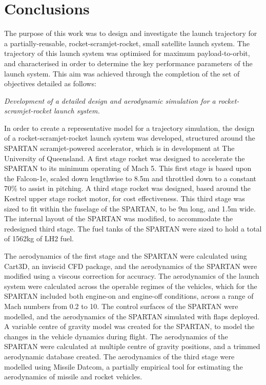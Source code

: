 
\cleardoublepage
\chapter{Conclusions}


The purpose of this work was to design and investigate the launch trajectory for a partially-reusable, rocket-scramjet-rocket, small satellite launch system. 
The trajectory of this launch system was optimised for maximum payload-to-orbit, and characterised in order to determine the key performance parameters of the launch system. 
This aim was achieved through the completion of the set of objectives detailed as follows:

	\emph{Development of a detailed design and aerodynamic simulation for a rocket-scramjet-rocket launch system.}
	
	In order to create a representative model for a trajectory simulation, the design of a rocket-scramjet-rocket launch system was developed, structured around the SPARTAN scramjet-powered accelerator, which is in development at The University of Queensland. A first stage rocket was designed to accelerate the SPARTAN to its minimum operating of Mach 5. This first stage is based upon the Falcon-1e, scaled down lengthwise to 8.5m and throttled down to a constant 70\% to assist in pitching.
	A third stage rocket was designed, based around the Kestrel upper stage rocket motor, for cost effectiveness. This third stage was sized to fit within the fuselage of the SPARTAN, to be 9m long, and 1.5m wide.   
The internal layout of the SPARTAN was modified, to accommodate the redesigned third stage. The fuel tanks of the SPARTAN were sized to hold a total of 1562kg of LH2 fuel. 

The aerodynamics of the first stage and the SPARTAN were calculated using Cart3D, an inviscid CFD package, and the aerodynamics of the SPARTAN were modified using a viscous correction for accuracy. The aerodynamics of the launch system were calculated across the operable regimes of the vehicles, which for the SPARTAN included both engine-on and engine-off conditions, across a range of Mach numbers from 0.2 to 10. The control surfaces of the SPARTAN were modelled, and the aerodynamics of the SPARTAN simulated with flaps deployed. A variable centre of gravity model was created for the SPARTAN, to model the changes in the vehicle dynamics during flight. The aerodynamics of the SPARTAN were calculated at multiple centre of gravity positions, and a trimmed aerodynamic database created. 
The aerodynamics of the third stage were modelled using Missile Datcom, a partially empirical tool for estimating the aerodynamics of missile and rocket vehicles. 


